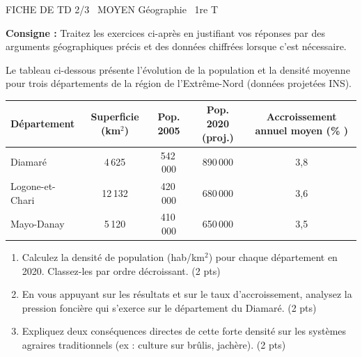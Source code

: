 \documentclass[11pt]{article}
\begin{document}
\begin{tcolorbox}[enhanced,colback=popink,colframe=popink,arc=10pt,boxrule=0pt,left=12pt,right=12pt,top=9pt,bottom=9pt]
{\color{white}\popxbold\small FICHE DE TD 2/3 \textbullet\ MOYEN \hfill Géographie \textbullet\ 1re T\par}
\end{tcolorbox}
\vspace{4pt}
\noindent \textbf{Consigne :} Traitez les exercices ci-après en justifiant vos réponses par des arguments géographiques précis et des données chiffrées lorsque c'est nécessaire.

\begin{exercice}
\label{exo:nord}
Le tableau ci-dessous présente l'évolution de la population et la densité moyenne pour trois départements de la région de l'Extrême-Nord (données projetées INS).

\begin{center}
\begin{tabular}{|l|c|c|c|c|}
\hline
\textbf{Département} & \textbf{Superficie (km$^2$)} & \textbf{Pop. 2005} & \textbf{Pop. 2020 (proj.)} & \textbf{Accroissement annuel moyen (\% )} \\
\hline
Diamaré & 4\,625 & 542\,000 & 890\,000 & 3,8 \\
Logone-et-Chari & 12\,132 & 420\,000 & 680\,000 & 3,6 \\
Mayo-Danay & 5\,120 & 410\,000 & 650\,000 & 3,5 \\
\hline
\end{tabular}
\end{center}

\begin{enumerate}
    \item Calculez la densité de population (hab/km$^2$) pour chaque département en 2020. Classez-les par ordre décroissant. (2 pts)
    \item En vous appuyant sur les résultats et sur le taux d'accroissement, analysez la pression foncière qui s'exerce sur le département du Diamaré. (2 pts)
    \item Expliquez deux conséquences directes de cette forte densité sur les systèmes agraires traditionnels (ex : culture sur brûlis, jachère). (2 pts)
\end{enumerate}
\end{exercice}
\end{document}
